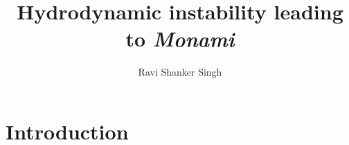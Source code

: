 \documentclass[12pt]{report}   %
\title{
Hydrodynamic instability leading to \textit{Monami}
}
\author{Ravi Shanker Singh}
\begin{document}
\doublespacing
\begin{preliminaries}
\maketitle

\copyrightpage

\begin{signature}
\end{signature}

\begin{vita}
\end{vita}

\begin{acknowledgments}
\end{acknowledgments}

\begin{abstract}
  \thispagestyle{empty}
\end{abstract}

\begin{spacing}{1}
  \tableofcontents
  \clearpage{\pagestyle{empty}\cleardoublepage}

  \footnotesize
  \fontsize{11.5pt}{12.5pt}\selectfont
  \listoftables
  \clearpage{\pagestyle{empty}\cleardoublepage}

  \listoffigures
  \clearpage{\pagestyle{empty}\cleardoublepage}
  \normalsize
\end{spacing}

\end{preliminaries}

\pagestyle{myheadings}


\chapter{Introduction}
\end{document}
